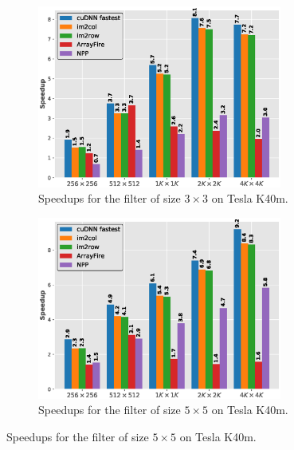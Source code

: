 \begin{figure}
\begin{subfigure}{\columnwidth}
		\centering
		 \includegraphics[width=\columnwidth,height=6cm]{./figure/2d_norm_f3.eps}
		 \caption{Speedups for the filter of size $3 \times 3$ on Tesla K40m.}
		 \label{fig:2druntimef3c1}
	\end{subfigure}
	\begin{subfigure}{\columnwidth}
		\centering
		 \includegraphics[width=\columnwidth,height=6cm]{./figure/2d_norm_f5.eps}
		 \caption{Speedups for the filter of size $5 \times 5$ on Tesla K40m.}
		 \label{fig:2druntimef5c1}
	\end{subfigure}
	

\end{figure}
